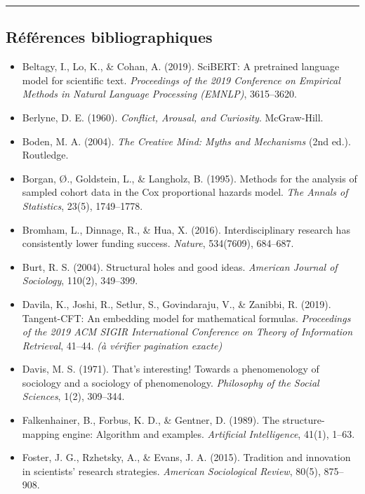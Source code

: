 \documentclass[a4paper,11pt]{article}
\providecommand{\tightlist}{\setlength{\itemsep}{0pt}\setlength{\parskip}{0pt}}
\begin{document}
\begin{center}\rule{0.5\linewidth}{0.5pt}\end{center}

\subsection*{Références bibliographiques}

\begin{itemize}
\tightlist
\item
  Beltagy, I., Lo, K., \& Cohan, A. (2019). SciBERT: A pretrained
  language model for scientific text. \emph{Proceedings of the 2019
  Conference on Empirical Methods in Natural Language Processing
  (EMNLP)}, 3615--3620.
\item
  Berlyne, D. E. (1960). \emph{Conflict, Arousal, and Curiosity}.
  McGraw-Hill.
\item
  Boden, M. A. (2004). \emph{The Creative Mind: Myths and Mechanisms}
  (2nd ed.). Routledge.
\item
  Borgan, Ø., Goldstein, L., \& Langholz, B. (1995). Methods for the
  analysis of sampled cohort data in the Cox proportional hazards model.
  \emph{The Annals of Statistics}, 23(5), 1749--1778.
\item
  Bromham, L., Dinnage, R., \& Hua, X. (2016). Interdisciplinary
  research has consistently lower funding success. \emph{Nature},
  534(7609), 684--687.
\item
  Burt, R. S. (2004). Structural holes and good ideas. \emph{American
  Journal of Sociology}, 110(2), 349--399.
\item
  Davila, K., Joshi, R., Setlur, S., Govindaraju, V., \& Zanibbi, R.
  (2019). Tangent-CFT: An embedding model for mathematical formulas.
  \emph{Proceedings of the 2019 ACM SIGIR International Conference on
  Theory of Information Retrieval}, 41--44. \emph{(à vérifier pagination
  exacte)}
\item
  Davis, M. S. (1971). That's interesting! Towards a phenomenology of
  sociology and a sociology of phenomenology. \emph{Philosophy of the
  Social Sciences}, 1(2), 309--344.
\item
  Falkenhainer, B., Forbus, K. D., \& Gentner, D. (1989). The
  structure-mapping engine: Algorithm and examples. \emph{Artificial
  Intelligence}, 41(1), 1--63.
\item
  Foster, J. G., Rzhetsky, A., \& Evans, J. A. (2015). Tradition and
  innovation in scientists' research strategies. \emph{American
  Sociological Review}, 80(5), 875--908.

\end{itemize}
\end{document}
